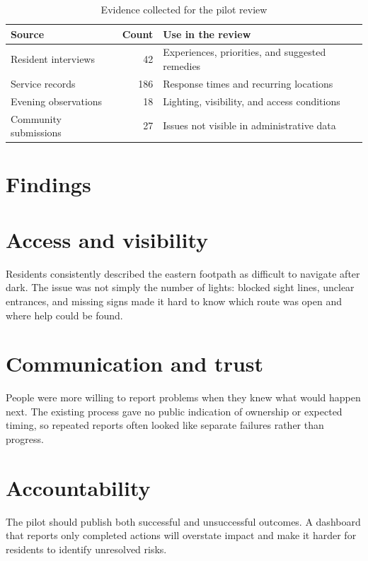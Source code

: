 \documentclass[freefonts,nologo]{amnestyreport}
\begin{document}
\begin{table}[ht]
  \centering
  \caption{Evidence collected for the pilot review}
  \begin{tabularx}{0.9\textwidth}{@{}l r X@{}}
    \toprule
    Source & Count & Use in the review \\
    \midrule
    Resident interviews & 42 & Experiences, priorities, and suggested remedies \\
    Service records & 186 & Response times and recurring locations \\
    Evening observations & 18 & Lighting, visibility, and access conditions \\
    Community submissions & 27 & Issues not visible in administrative data \\
    \bottomrule
  \end{tabularx}
\end{table}

\section{Findings}
\section{Access and visibility}

Residents consistently described the eastern footpath as difficult to navigate
after dark. The issue was not simply the number of lights: blocked sight lines,
unclear entrances, and missing signs made it hard to know which route was open
and where help could be found.

\section{Communication and trust}

People were more willing to report problems when they knew what would happen next.
The existing process gave no public indication of ownership or expected timing,
so repeated reports often looked like separate failures rather than progress.

\section{Accountability}

The pilot should publish both successful and unsuccessful outcomes. A dashboard
that reports only completed actions will overstate impact and make it harder for
residents to identify unresolved risks.
\end{document}
